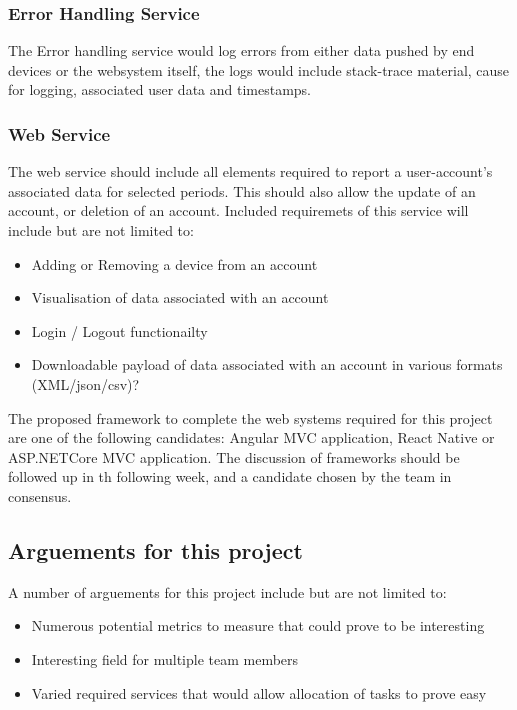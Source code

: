 \documentclass{article}
\begin{document}
            \subsubsection{Error Handling Service}
            The Error handling service would log errors from either data pushed by end devices or the websystem itself,
            the logs would include stack-trace material, cause for logging, associated user data and timestamps.

            \subsubsection{Web Service}
            The web service should include all elements required to report a user-account's associated data
            for selected periods. This should also allow the update of an account, or deletion of an account.
            Included requiremets of this service will include but are not limited to:
            \begin{itemize}
                \item Adding or Removing a device from an account
                \item Visualisation of data associated with an account
                \item Login / Logout functionailty
                \item Downloadable payload of data associated with an account in various formats (XML/json/csv)?
            \end{itemize}
            \par
            The proposed framework to complete the web systems required for this project are one of the following 
            candidates: Angular MVC application\cite{Angular}, React Native\cite{ReactNative} or ASP.NETCore MVC 
            application\cite{ASP.NETcore-MVC}.
            The discussion of frameworks should be followed up in th following week, and a candidate chosen
            by the team in consensus.
            
            \subsection{Arguements for this project}
            A number of arguements for this project include but are not limited to:
            \begin{itemize}
                \item Numerous potential metrics to measure that could prove to be interesting
                \item Interesting field for multiple team members
                \item Varied required services that would allow allocation of tasks to prove easy
            \end{itemize}
\end{document}
